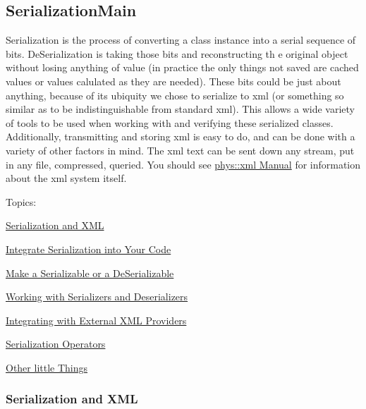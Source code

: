 \hypertarget{Serialization_SerializationMain}{}\subsection{SerializationMain}\label{Serialization_SerializationMain}
Serialization is the process of converting a class instance into a serial sequence of bits. DeSerialization is taking those bits and reconstructing th e original object without losing anything of value (in practice the only things not saved are cached values or values calulated as they are needed). These bits could be just about anything, because of its ubiquity we chose to serialize to xml (or something so similar as to be indistinguishable from standard xml). This allows a wide variety of tools to be used when working with and verifying these serialized classes. Additionally, transmitting and storing xml is easy to do, and can be done with a variety of other factors in mind. The xml text can be sent down any stream, put in any file, compressed, queried. You should see \hyperlink{XMLManual}{phys::xml Manual} for information about the xml system itself. \par
 \par
 Topics:
\begin{DoxyItemize}
\item \hyperlink{Serialization_serializationxml}{Serialization and XML}
\item \hyperlink{Serialization_serializationintegration}{Integrate Serialization into Your Code}
\begin{DoxyItemize}
\item \hyperlink{Serialization_serializationmaking}{Make a Serializable or a DeSerializable}
\item \hyperlink{Serialization_serializationserializers}{Working with Serializers and Deserializers}
\item \hyperlink{Serialization_serializationlegacy}{Integrating with External XML Providers}
\end{DoxyItemize}
\item \hyperlink{Serialization_serializationoperators}{Serialization Operators}
\item \hyperlink{Serialization_serializationmisc}{Other little Things} 
\end{DoxyItemize}\hypertarget{Serialization_serializationxml}{}\subsubsection{Serialization and XML}\label{Serialization_serializationxml}
